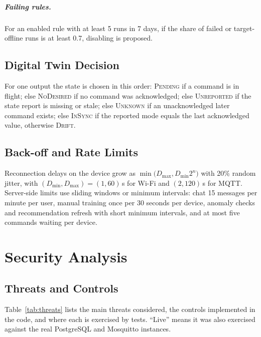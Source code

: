 \documentclass[12pt,a4paper,oneside]{report}
\begin{document}
\paragraph{Failing rules.} For an enabled rule with at least 5 runs in 7 days, if the share of failed or target-offline runs is at least 0.7, disabling is proposed.

\section{Digital Twin Decision}
For one output the state is chosen in this order: \textsc{Pending} if a command is in flight; else \textsc{NoDesired} if no command was acknowledged; else \textsc{Unreported} if the state report is missing or stale; else \textsc{Unknown} if an unacknowledged later command exists; else \textsc{InSync} if the reported mode equals the last acknowledged value, otherwise \textsc{Drift}.

\section{Back-off and Rate Limits}
Reconnection delays on the device grow as $\min\big(D_{\max},D_{\min}2^{n}\big)$ with 20\% random jitter, with $(D_{\min},D_{\max})=(1,60)$\,s for Wi-Fi and $(2,120)$\,s for MQTT. Server-side limits use sliding windows or minimum intervals: chat 15 messages per minute per user, manual training once per 30 seconds per device, anomaly checks and recommendation refresh with short minimum intervals, and at most five commands waiting per device.

\chapter{Security Analysis}
\label{ch:security}

\section{Threats and Controls}
Table~\ref{tab:threats} lists the main threats considered, the controls implemented in the code, and where each is exercised by tests. ``Live'' means it was also exercised against the real PostgreSQL and Mosquitto instances.
\end{document}
